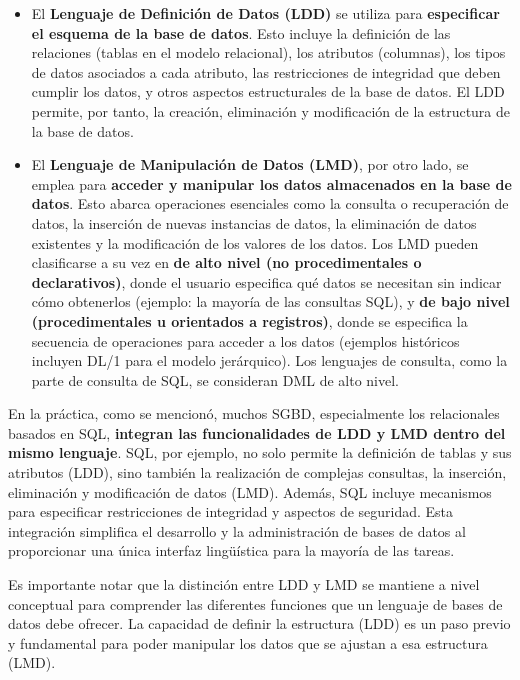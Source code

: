 \begin{itemize}
    \item El \textbf{Lenguaje de Definición de Datos (LDD)} se utiliza para \textbf{especificar el esquema de la base de datos}. Esto incluye la definición de las relaciones (tablas en el modelo relacional), los atributos (columnas), los tipos de datos asociados a cada atributo, las restricciones de integridad que deben cumplir los datos, y otros aspectos estructurales de la base de datos. El LDD permite, por tanto, la creación, eliminación y modificación de la estructura de la base de datos.

    \item El \textbf{Lenguaje de Manipulación de Datos (LMD)}, por otro lado, se emplea para \textbf{acceder y manipular los datos almacenados en la base de datos}. Esto abarca operaciones esenciales como la consulta o recuperación de datos, la inserción de nuevas instancias de datos, la eliminación de datos existentes y la modificación de los valores de los datos. Los LMD pueden clasificarse a su vez en \textbf{de alto nivel (no procedimentales o declarativos)}, donde el usuario especifica qué datos se necesitan sin indicar cómo obtenerlos (ejemplo: la mayoría de las consultas SQL), y \textbf{de bajo nivel (procedimentales u orientados a registros)}, donde se especifica la secuencia de operaciones para acceder a los datos (ejemplos históricos incluyen DL/1 para el modelo jerárquico). Los lenguajes de consulta, como la parte de consulta de SQL, se consideran DML de alto nivel.
\end{itemize}

En la práctica, como se mencionó, muchos SGBD, especialmente los relacionales basados en SQL, \textbf{integran las funcionalidades de LDD y LMD dentro del mismo lenguaje}. SQL, por ejemplo, no solo permite la definición de tablas y sus atributos (LDD), sino también la realización de complejas consultas, la inserción, eliminación y modificación de datos (LMD). Además, SQL incluye mecanismos para especificar restricciones de integridad y aspectos de seguridad. Esta integración simplifica el desarrollo y la administración de bases de datos al proporcionar una única interfaz lingüística para la mayoría de las tareas.

Es importante notar que la distinción entre LDD y LMD se mantiene a nivel conceptual para comprender las diferentes funciones que un lenguaje de bases de datos debe ofrecer. La capacidad de definir la estructura (LDD) es un paso previo y fundamental para poder manipular los datos que se ajustan a esa estructura (LMD).

